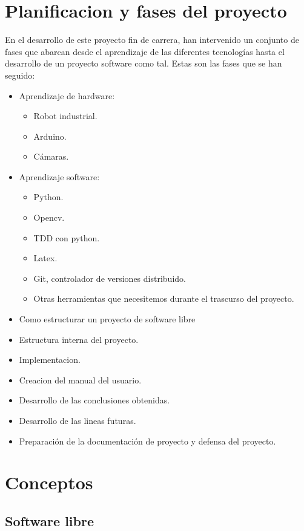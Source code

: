 \documentclass[12pt,a4paper]{report}
\begin{document}
\section{Planificacion y fases del proyecto}

En el desarrollo de este proyecto fin de carrera, han intervenido un conjunto de
fases que abarcan desde el aprendizaje de las diferentes tecnologías hasta el
desarrollo de un proyecto software como tal.
Estas son las fases que se han seguido:
\begin{itemize} 
	\item Aprendizaje de hardware:
    \begin{itemize} 
        \item Robot industrial.
        \item Arduino.
        \item Cámaras.
    \end{itemize}
    \item Aprendizaje software:
    \begin{itemize} 
        \item Python. 
        \item Opencv. 
        \item TDD con python.
        \item Latex.
        \item Git, controlador de versiones distribuido. 
        \item Otras herramientas que necesitemos durante el trascurso del
        proyecto. 
    \end{itemize}
    \item Como estructurar un proyecto de software libre 
    \item Estructura interna del proyecto. 
	\item Implementacion.
	\item Creacion del manual del usuario.
	\item Desarrollo de las conclusiones obtenidas.
	\item Desarrollo de las lineas futuras.
	\item Preparación de la documentación de proyecto y defensa del proyecto.
	 
\end{itemize}

\section{Conceptos}

\subsection{Software libre}
\end{document}
